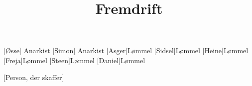 \documentclass[a4paper,11pt]{article}
\title{Fremdrift}
\begin{document}
\maketitle

\begin{roles}
[Øsse] Anarkist
[Simon] Anarkist
[Asger]Lømmel
[Sidsel]Lømmel
[Heine]Lømmel
[Freja]Lømmel
[Steen]Lømmel
[Daniel]Lømmel
\end{roles}


\begin{props}
\prop{-}[Person, der skaffer]
\end{props}
\end{document}
